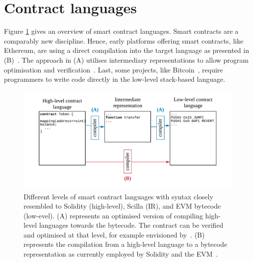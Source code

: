 \section{Contract languages}
\label{languages}

Figure \ref{fig:languagediagram} gives an overview of smart contract languages.
Smart contracts are a comparably new discipline.
Hence, early platforms offering smart contracts, like Ethereum, are using a direct compilation into the target language as presented in (B)~\cite{Ethereum2018Solidity,Ethereum2018Vyper}.
The approach in (A) utilises intermediary representations to allow program optimisation and verification~\cite{OCamlProSAS2018,DynamicLedgerSolutions2017,Sergey2018}. 
Last, some projects, like Bitcoin~\cite{BitcoinWiki2018Script}, require programmers to write code directly in the low-level stack-based language.





\begin{figure}[!t]
\normalsize
\centering
\includegraphics[width=\columnwidth]{fig/Language.pdf}
\caption{Different levels of smart contract languages with syntax closely resembled to Solidity (high-level), Scilla (IR), and EVM bytecode (low-evel). (A) represents an optimised version of compiling high-level languages towards the bytecode. The contract can be verified and optimised at that level, for example envisioned by~\cite{Sergey2018,OCamlProSAS2018}. (B) represents the  compilation from a high-level language to a bytecode representation as currently employed by Solidity and the EVM~\cite{Ethereum2018Solidity,Wood2014}.}
\label{fig:languagediagram}
\end{figure}


